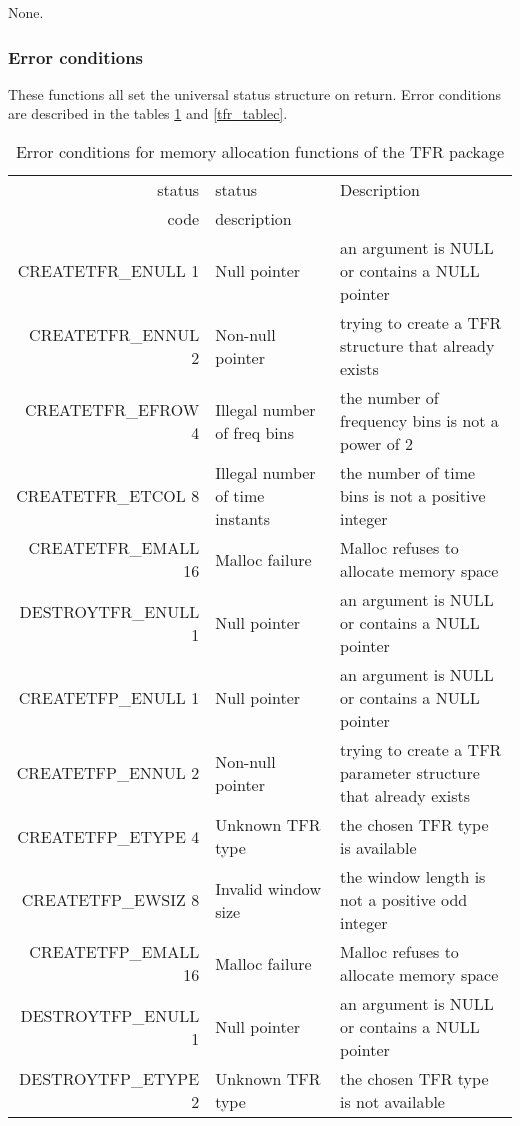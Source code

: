 \documentclass{article}
\begin{document}
None. 

\subsubsection{Error conditions}


These functions all set the universal status structure on return.
Error conditions are described in the tables \ref{tfr_tableb} and
\ref{tfr_tablec}.

\begin{table}
\begin{tabular}{|r|l|p{2in}|}
\hline
status  & status          & Description\\
code    & description     & \\
\hline
CREATETFR\_ENULL 1  & Null pointer
& an argument is NULL or contains a NULL pointer\\
CREATETFR\_ENNUL 2  & Non-null pointer 
& trying to create a TFR structure that already exists\\
CREATETFR\_EFROW 4  & Illegal number of freq bins 
& the number of frequency bins is not a power of 2\\
CREATETFR\_ETCOL 8  & Illegal number of time instants 
& the number of time bins is not a positive integer\\
CREATETFR\_EMALL 16 & Malloc failure 
& Malloc refuses to allocate memory space\\
\hline
\hline
DESTROYTFR\_ENULL 1  & Null pointer
& an argument is NULL or contains a NULL pointer\\
\hline
\hline
CREATETFP\_ENULL 1  & Null pointer
& an argument is NULL or contains a NULL pointer\\
CREATETFP\_ENNUL 2  & Non-null pointer 
& trying to create a TFR parameter structure that already exists\\
CREATETFP\_ETYPE 4  & Unknown TFR type
& the chosen TFR type is available\\
CREATETFP\_EWSIZ 8 & Invalid window size
& the window length is not a positive odd integer\\
CREATETFP\_EMALL 16  & Malloc failure 
& Malloc refuses to allocate memory space\\
\hline
\hline
DESTROYTFP\_ENULL 1  & Null pointer
& an argument is NULL or contains a NULL pointer\\
DESTROYTFP\_ETYPE 2  & Unknown TFR type
& the chosen TFR type is not available\\
\hline
\end{tabular}
\caption{\label{tfr_tableb}Error conditions for memory allocation
functions of the TFR package}
\end{table}
\end{document}
